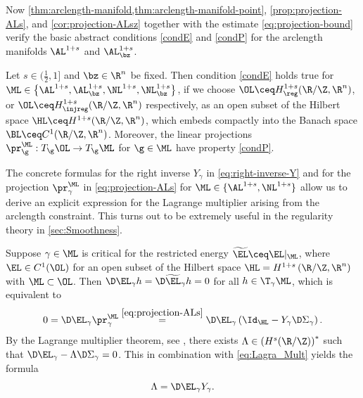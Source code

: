 Now \cref{thm:arclength-manifold,thm:arclength-manifold-point},
\cref{prop:projection-ALs}, and \cref{cor:projection-ALsz} 
together with the estimate \cref{eq:projection-bound}
verify the basic abstract conditions
\ref{condE} and \ref{condP} for the arclength manifolds $\AL^{1+s}$ 
and
$\AL^{1+s}_\bz$.
\begin{corollary}
\label{cor:basic-assumptions}
Let $s\in (\frac{1}{2},1]$ and $\bz\in\R^n$ be fixed. Then condition \ref{condE}
holds true for $\ML\in \left\{\AL^{1+s},\AL_{\bz}^{1+s},\NL^{1+s},\NL_{\bz}^{1+s}\right\}$, if we choose 
$\OL \ceq H^{1+s}_\reg(\R/\Z,\R^n)$, or $ \OL\ceq H^{1+s}_\injreg(\R/\Z,\R^n)$ respectively, as an open subset of the Hilbert space
$\HL \ceq H^{1+s}(\R/\Z,\R^n)$, which embeds compactly into
the Banach space $\BL \ceq C^1(\R/\Z,\R^n)$. 
Moreover, the linear projections $\pr_\g^{\ML}:
T_\g\OL\to T_\g\ML$ for $\g\in\ML$ have property \ref{condP}.
\end{corollary}

\begin{remark}\label{rem:explicit-lagrange-multiplier}
	The concrete formulas for the right inverse $ Y_{\gamma} $ in \cref{eq:right-inverse-Y} and for the projection $ \pr^{\ML}_{\gamma} $ in \cref{eq:projection-ALs} for $ \ML\in \{\AL^{1+s},\NL^{1+s}\} $ allow us to derive an explicit expression for the Lagrange multiplier arising from the arclength constraint. This turns out to be extremely useful in the regularity theory in \cref{sec:Smoothness}. 

	Suppose $ \gamma\in \ML $ is critical for the restricted energy $ \widetilde{\EL}\ceq\EL\vert_{\ML} $, where $ \EL \in C^1(\OL)$ for an open subset of the Hilbert space $ \HL=H^{1+s}\left( \R/\Z,\R^n \right) $ with $ \ML\subset\OL $. Then $ \D \EL_{\gamma}h=\D \widetilde{\EL}_{\gamma}h =0$ for all $h\in \T_{\gamma}\ML $, which is equivalent to 
	\begin{equation}\label{eq:Lagra_Mult}
	\begin{aligned}
		0=\D\EL_{\gamma} \pr^{\ML}_{\gamma}\overset{\cref{eq:projection-ALs}}{=} \D\EL_{\gamma}\left( \Id_{\HL}-Y_{\gamma}\D\Sigma_{\gamma} \right).
	\end{aligned}
	\end{equation}
	By the Lagrange multiplier theorem, see \cite[Corollary 3.5.29]{abraham-etal_1988}, there exists $ \Lambda\in \left( H^{s}(\R/\Z) \right)^* $ such that $ \D\EL_{\gamma}-\Lambda\D\Sigma_{\gamma}=0 $. This in combination with \cref{eq:Lagra_Mult} yields the formula 
	\[\Lambda=\D\EL_{\gamma}Y_{\gamma}.\]
\end{remark}

